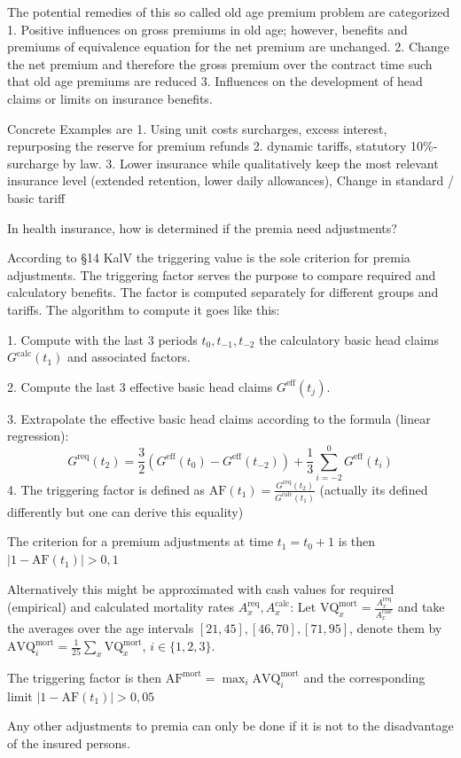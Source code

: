 \documentclass[11pt,a4paper,twoside]{article}
\begin{document}
The potential remedies of this so called old age premium problem are categorized
1. Positive influences on gross premiums in old age; however, benefits and premiums of
   equivalence equation for the net premium are unchanged.
2. Change the net premium and therefore the gross premium over the contract time
   such that old age premiums are reduced
3. Influences on the development of head claims or limits on insurance benefits.

Concrete Examples are
1. Using unit costs surcharges, excess interest, repurposing the reserve for premium refunds
2. dynamic tariffs, statutory 10\%-surcharge by law.
3. Lower insurance while qualitatively keep the most relevant insurance level (extended retention, lower daily allowances), 
   Change in standard / basic tariff



In health insurance, how is determined if the premia need adjustments?

According to §14 KalV the triggering value is the sole criterion for premia adjustments.
The triggering factor serves the purpose to compare required and calculatory benefits.
The factor is computed separately for different groups and tariffs.
The algorithm to compute it goes like this:

1. Compute with the last 3 periods \( t_0, t_{-1}, t_{-2} \) the calculatory basic head claims \( G^{\text{calc}}(t_{1}) \)
and associated factors.

2. Compute the last 3 effective basic head claims \( G^{\text{eff}}(t_j) \).

3. Extrapolate the effective basic head claims according to the formula (linear regression):
\[ G^{\text{req}}(t_{2}) = \frac{3}{2}(G^{\text{eff}}(t_0) - G^{\text{eff}}(t_{-2})) + \frac{1}{3} \sum_{i=-2}^0 G^{\text{eff}}(t_{i}) \]
4. The triggering factor is defined as \( \text{AF}(t_{1}) = \frac{G^{\text{req}}(t_{2})}{G^{\text{calc}}(t_{1})} \)
(actually its defined differently but one can derive this equality)

The criterion for a premium adjustments at time \( t_1 = t_0 + 1 \) is then 
\( |1 - \text{AF}(t_{1})| > 0,1 \)

Alternatively this might be approximated with cash values for required (empirical) and calculated mortality rates 
\( A^{\text{req}}_x, A^{\text{calc}}_x \):
Let \( \text{VQ}_x^{\text{mort}} = \frac{A^{\text{req}}_x}{A^{\text{calc}}_x} \) and take the averages 
over the age intervals \( [21, 45], [46, 70], [71, 95] \), denote them by 
\( \text{AVQ}_i^{\text{mort}} = \frac{1}{25} \sum_x \text{VQ}_x^{\text{mort}} \), \( i \in \{1, 2, 3\}\).

The triggering factor is then 
\( \text{AF}^{\text{mort}} = \max_i \text{AVQ}_i^{\text{mort}} \)
and the corresponding limit
\( |1 - \text{AF}(t_{1})| > 0,05 \)

Any other adjustments to premia can only be done if it is not to the disadvantage of the insured persons.

\end{document}
